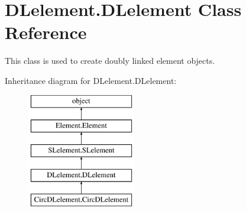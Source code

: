 \hypertarget{class_d_lelement_1_1_d_lelement}{}\section{D\+Lelement.\+D\+Lelement Class Reference}
\label{class_d_lelement_1_1_d_lelement}


This class is used to create doubly linked element objects.  


Inheritance diagram for D\+Lelement.\+D\+Lelement\+:\begin{figure}[H]
\begin{center}
\leavevmode
\includegraphics[height=5.000000cm]{class_d_lelement_1_1_d_lelement}
\end{center}
\end{figure}
